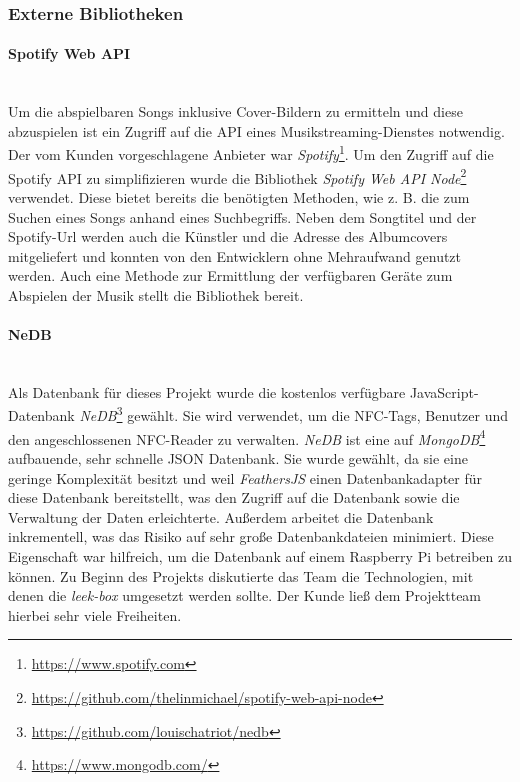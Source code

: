 \documentclass[10pt, a4paper]{article}
\begin{document}
\begin{onehalfspace}
  \subsubsection{Externe Bibliotheken}
  \paragraph{Spotify Web API} $~$ \\
  \label{SpotifyWebApiNode}
  Um die abspielbaren Songs inklusive Cover-Bildern zu ermitteln und diese abzuspielen ist ein Zugriff auf die API eines Musikstreaming-Dienstes notwendig.
  Der vom Kunden vorgeschlagene Anbieter war \textit{Spotify}\footnote{\url{https://www.spotify.com}}.
  Um den Zugriff auf die Spotify API zu simplifizieren wurde die Bibliothek \textit{Spotify Web API Node}\footnote{\url{https://github.com/thelinmichael/spotify-web-api-node}} verwendet.
  Diese bietet bereits die benötigten Methoden, wie z. B. die zum Suchen eines Songs anhand eines Suchbegriffs.
  Neben dem Songtitel und der Spotify-Url werden auch die Künstler und die Adresse des Albumcovers mitgeliefert und konnten von den Entwicklern ohne Mehraufwand genutzt werden.
  Auch eine Methode zur Ermittlung der verfügbaren Geräte zum Abspielen der Musik stellt die Bibliothek bereit.

  \paragraph{NeDB} $~$ \\
  Als Datenbank für dieses Projekt wurde die kostenlos verfügbare JavaScript-Datenbank \textit{NeDB}\footnote{\raggedright\url{https://github.com/louischatriot/nedb}} gewählt.
  Sie wird verwendet, um die NFC-Tags, Benutzer und den angeschlossenen NFC-Reader zu verwalten.
  \textit{NeDB} ist eine auf \textit{MongoDB}\footnote{\raggedright\url{https://www.mongodb.com/}} aufbauende, sehr schnelle JSON Datenbank.
  Sie wurde gewählt, da sie eine geringe Komplexität besitzt und weil \textit{FeathersJS} einen Datenbankadapter für diese Datenbank bereitstellt, was den Zugriff auf die Datenbank sowie die Verwaltung der Daten erleichterte.
  Außerdem arbeitet die Datenbank inkrementell, was das Risiko auf sehr große Datenbankdateien minimiert.
  Diese Eigenschaft war hilfreich, um die Datenbank auf einem Raspberry Pi betreiben zu können.
  Zu Beginn des Projekts diskutierte das Team die Technologien, mit denen die \textit{leek-box} umgesetzt werden sollte.
  Der Kunde ließ dem Projektteam hierbei sehr viele Freiheiten.


\end{onehalfspace}
\end{document}
